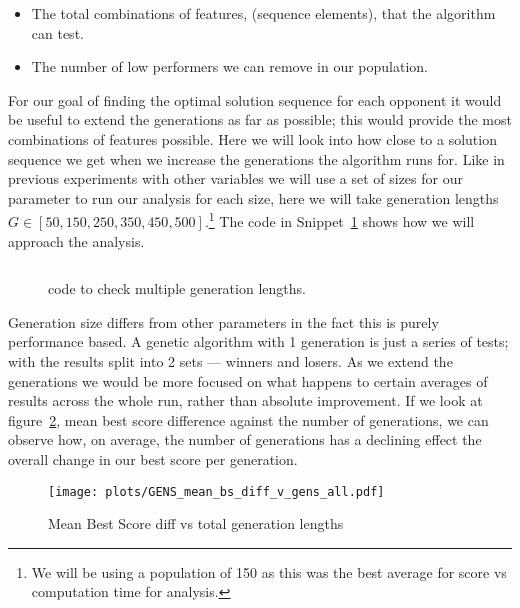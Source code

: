 \begin{itemize}
    \item The total combinations of features, (sequence elements), that the algorithm can test.
    \item The number of low performers we can remove in our population.
\end{itemize}

For our goal of finding the optimal solution sequence for each opponent it would be useful to extend the generations as far as possible;
this would provide the most combinations of features possible.
Here we will look into how close to a solution sequence we get when we increase the generations the algorithm runs for.
Like in previous experiments with other variables we will use a set of sizes for our parameter to run our analysis for each size, here we will take generation lengths \(G \in [50,150,250,350,450,500]\).\footnote{We will be using a population of 150 as this was the best average for score vs computation time for analysis.}
The code in Snippet~\ref{code:generationChecker} shows how we will approach the analysis.\\

\begin{figure}
    \inputminted{python}{code_snippets/generationChecker.py}
    \caption{code to check multiple generation lengths.}\label{code:generationChecker}
\end{figure}

Generation size differs from other parameters in the fact this is purely performance based.
A genetic algorithm with 1 generation is just a series of tests;
with the results split into 2 sets --- winners and losers.
As we extend the generations we would be more focused on what happens to certain averages of results across the whole run, rather than absolute improvement.
If we look at figure~\ref{fig:GENS-mean-bs-diff-v-gens-all}, mean best score difference against the number of generations, we can observe how, on average, the number of generations has a declining effect the overall change in our best score per generation.\\

\begin{figure}[h]
    \texttt{[image: plots/GENS\_mean\_bs\_diff\_v\_gens\_all.pdf]}
    \caption{Mean Best Score diff vs total generation lengths}\label{fig:GENS-mean-bs-diff-v-gens-all}
\end{figure}

